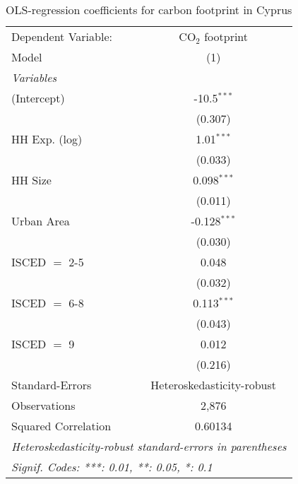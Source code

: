 
\begin{table}[htbp!]
   \centering
   \small
   \begin{adjustbox}{width = 1\textwidth, max height = 0.95\textheight, center}
      \begin{threeparttable}[b]
         \caption{\label{tab:OLS_2_CYP} OLS-regression coefficients for carbon footprint in Cyprus}
         \begin{tabular}{lc}
            \tabularnewline \midrule \midrule
            Dependent Variable: & CO$_{2}$ footprint\\  
            Model               & (1)\\  
            \midrule
            \emph{Variables}\\
            (Intercept)         & -10.5$^{***}$\\   
                                & (0.307)\\   
            HH Exp. (log)       & 1.01$^{***}$\\   
                                & (0.033)\\   
            HH Size             & 0.098$^{***}$\\   
                                & (0.011)\\   
            Urban Area          & -0.128$^{***}$\\   
                                & (0.030)\\   
            ISCED $=$ 2-5       & 0.048\\   
                                & (0.032)\\   
            ISCED $=$ 6-8       & 0.113$^{***}$\\   
                                & (0.043)\\   
            ISCED $=$ 9         & 0.012\\   
                                & (0.216)\\   
            \midrule 
            Standard-Errors     & Heteroskedasticity-robust \\   
            Observations        & 2,876\\  
            Squared Correlation & 0.60134\\  
            \midrule \midrule
            \multicolumn{2}{l}{\emph{Heteroskedasticity-robust standard-errors in parentheses}}\\
            \multicolumn{2}{l}{\emph{Signif. Codes: ***: 0.01, **: 0.05, *: 0.1}}\\
         \end{tabular}
         

\end{threeparttable}
\end{adjustbox}
\end{table}
